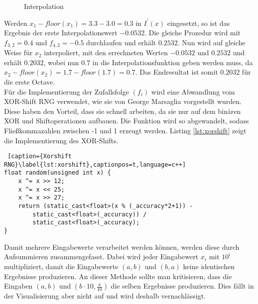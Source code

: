 \documentclass[11pt,a4paper]{article}
\begin{document}
\begin{center}
\begin{figure}[!ht]
\centering
{}
\caption[Interpolation]{Interpolation}
\label{fig:iprime}
\end{figure}
\end{center}
Werden $x_1 - floor(x_1) = 3.3 - 3.0 = 0.3$ in $I^\prime(x)$ eingesetzt, so ist das Ergebnis der erste Interpolationswert $-0.0532$. Die gleiche Prozedur wird mit $f_{3, 2} = 0.4$ und $f_{4, 2} = -0.5$ durchlaufen und erhält $0.2532$. Nun wird auf gleiche Weise für $x_2$ interpoliert, mit den errechneten Werten $-0.0532$ und $0.2532$ und erhält $0.2032$, wobei nun $0.7$ in die Interpolationsfunktion geben werden muss, da $x_2 - floor(x_2) = 1.7 - floor(1.7) = 0.7$. Das Endresultat ist somit $0.2032$ für die erste Octave.\\
Für die Implementierung der Zufallsfolge $(f_i)$ wird eine Abwandlung vom XOR-Shift RNG verwendet, wie sie von George Marsaglia \cite{ac8e278bab88e59aa3a147bef7b113350a723aa4547b89da74bdcadaf0244f1b} vorgestellt wurden. Diese haben den Vorteil, dass sie schnell arbeiten, da sie nur auf dem binären XOR und Shiftoperationen aufbauen. Die Funktion wird so abgewandelt, sodass Fließkommazahlen zwischen -1 und 1 erzeugt werden. Listing \ref{lst:xorshift} zeigt die Implementierung des XOR-Shifts.

\begin{lstlisting} [caption={Xorshift RNG}\label{lst:xorshift},captionpos=t,language=c++]
float random(unsigned int x) {
	x ^= x >> 12;
	x ^= x << 25;
	x ^= x >> 27;
	return (static_cast<float>(x % (_accuracy*2+1)) -
		static_cast<float>(_accuracy)) /
		static_cast<float>(_accuracy);
}
\end{lstlisting}
\noindent
Damit mehrere Eingabewerte verarbeitet werden können, werden diese durch Aufsummieren zusammengefasst. Dabei wird jeder Eingabewert $x_i$ mit $10^i$ multipliziert, damit die Eingabewerte $(a, b)$ und $(b, a)$ keine identischen Ergebnisse produzieren. An dieser Methode sollte man kritisieren, dass die Eingaben $(a, b)$ und $(b\cdot 10, \frac{a}{10})$ die selben Ergebnisse produzieren. Dies fällt in der Visualisierung aber nicht auf und wird deshalb vernachlässigt.
\end{document}
